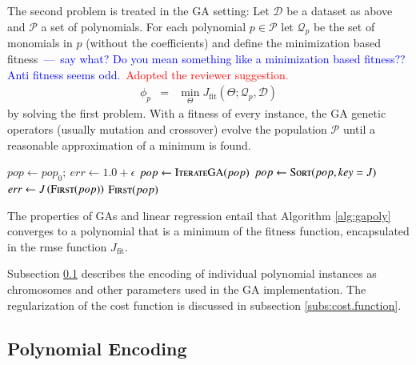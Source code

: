 \documentclass[review,preprint]{elsarticle}
\newcommand{\review}[1]{\textcolor{blue}{~---~#1}}
\newcommand{\revised}[2]{\review{#1}~\textcolor{red}{#2}}
\begin{document}
The second problem is treated in the \ac{GA} setting: Let $\mathcal{D}$ be a dataset as above and $\mathcal{P}$ a set of polynomials. For each polynomial $p\in \mathcal{P}$ let $\mathcal{Q}_p$ be the set of monomials in $p$ (without the coefficients) and define the minimization based fitness\revised{say what?  Do you mean something like a minimization based fitness??  Anti fitness seems odd.}{Adopted the reviewer suggestion.}
%
\begin{eqnarray}
\phi_p &=& \min_\Theta J_{\textrm{fit}}\left(\Theta;\mathcal{Q}_p,\mathcal{D}\right)
\end{eqnarray}
%
by solving the first problem. With a fitness of every instance, the \ac{GA} genetic operators (usually mutation and crossover) evolve the population $\mathcal{P}$ until a reasonable approximation of a minimum is found. 
%
\begin{algorithm}[t]
\begin{algorithmic}
	\State $pop \gets pop_0;\: err \gets 1.0+\epsilon$
		\State $pop \gets \Call{IterateGA}{pop}$
		\State $pop \gets \Call{Sort}{pop, key = J}$
		\State $err \gets J\left(\Call{First}{pop}\right)$
	\EndWhile
	\State\Return $\Call{First}{pop}$
\EndFunction
\end{algorithmic}
\caption{This \ac{EPR} algorithm uses linear regression for the calculation of the \ac{rmse} $J$ and the space of polynomials is searched in the \acp{GA} iteration step. At exit the \ac{rmse} of the fittest instance is bounded by $\epsilon$ or the maximum number of allowed iterations.}\label{alg:gapoly}
\end{algorithm} 
%
The properties of \acp{GA} and linear regression entail that Algorithm \ref{alg:gapoly} converges to a polynomial that is a minimum of the fitness function, encapsulated in the \ac{rmse} function $J_{\textrm{fit}}$.
%

%
Subsection \ref{subs:polynomial.encoding} describes the encoding of individual polynomial instances as chromosomes and other parameters used in the \ac{GA} implementation. The regularization of the cost function is discussed in subsection \ref{subs:cost.function}.

%
\subsection{Polynomial Encoding}\label{subs:polynomial.encoding}
\end{document}

